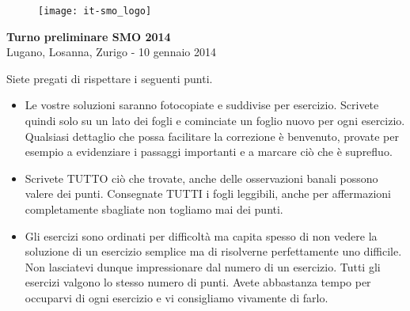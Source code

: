 \documentclass[12pt,a4paper]{article}
\begin{document}
\thispagestyle{empty}
\begin{figure}[h]
\texttt{[image: it-smo\_logo]}
\end{figure}

\vspace{1cm}

\begin{center}
\Huge{\textbf{Turno preliminare SMO 2014}}\\[1.5cm]
\large{Lugano, Losanna, Zurigo - 10 gennaio 2014}\\[3.5cm]
\end{center}


Siete pregati di rispettare i seguenti punti.

\begin{itemize}
\item Le vostre soluzioni saranno fotocopiate e suddivise per esercizio. Scrivete quindi solo su un lato dei fogli e cominciate un foglio nuovo per ogni esercizio. Qualsiasi dettaglio che possa facilitare la correzione è benvenuto, provate per esempio a evidenziare i passaggi importanti e a marcare ciò che è suprefluo.


\item Scrivete TUTTO ciò che trovate, anche delle osservazioni banali possono valere dei punti. Consegnate TUTTI i fogli leggibili, anche per affermazioni completamente sba\-glia\-te non togliamo mai dei punti.

\item Gli esercizi sono ordinati per difficoltà ma capita spesso di non vedere la soluzione di un esercizio semplice ma di risolverne perfettamente uno difficile. Non lasciatevi dunque impressionare dal numero di un esercizio. Tutti gli esercizi valgono lo stesso numero di punti. Avete abbastanza tempo per occuparvi di ogni esercizio e vi consigliamo vivamente di farlo.



\end{itemize}
\end{document}
